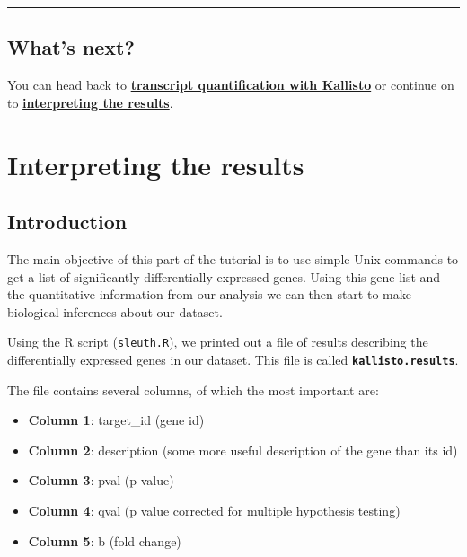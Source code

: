 \documentclass[11pt]{article}
\providecommand{\tightlist}{%
      \setlength{\itemsep}{0pt}\setlength{\parskip}{0pt}}
\begin{document}
    \begin{center}\rule{0.5\linewidth}{.4pt}\end{center}

    \hypertarget{whats-next}{%
\subsection{What's next?}\label{whats-next}}

You can head back to
\textbf{\href{transcript-quantification.ipynb}{transcript quantification
with Kallisto}} or continue on to
\textbf{\href{de-interpretation.ipynb}{interpreting the results}}.





\newpage





    \hypertarget{interpreting-the-results}{%
\section{Interpreting the results}\label{interpreting-the-results}}

    \hypertarget{introduction}{%
\subsection{Introduction}\label{introduction}}

The main objective of this part of the tutorial is to use simple Unix
commands to get a list of significantly differentially expressed genes.
Using this gene list and the quantitative information from our analysis
we can then start to make biological inferences about our dataset.

Using the R script (\texttt{sleuth.R}), we printed out a file of results
describing the differentially expressed genes in our dataset. This file
is called \textbf{\texttt{kallisto.results}}.

The file contains several columns, of which the most important are:

\begin{itemize}
\tightlist
\item
  \textbf{Column 1}: target\_id (gene id)\\
\item
  \textbf{Column 2}: description (some more useful description of the
  gene than its id)\\
\item
  \textbf{Column 3}: pval (p value)\\
\item
  \textbf{Column 4}: qval (p value corrected for multiple hypothesis
  testing)\\
\item
  \textbf{Column 5}: b (fold change)
\end{itemize}
\end{document}
